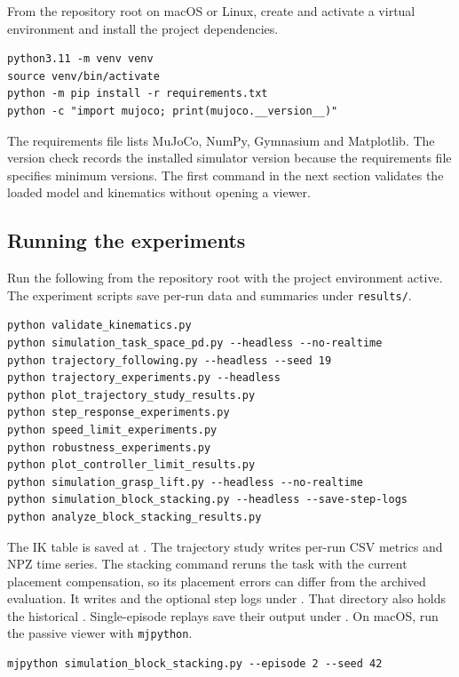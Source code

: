 \documentclass[12pt,a4paper]{article}
\begin{document}
From the repository root on macOS or Linux, create and activate a virtual environment and install the project dependencies.
\begin{samepage}
\begin{verbatim}
python3.11 -m venv venv
source venv/bin/activate
python -m pip install -r requirements.txt
python -c "import mujoco; print(mujoco.__version__)"
\end{verbatim}
\end{samepage}
The requirements file lists MuJoCo, NumPy, Gymnasium and Matplotlib. The version check records the installed simulator version because the requirements file specifies minimum versions. The first command in the next section validates the loaded model and kinematics without opening a viewer.

\subsection*{Running the experiments}
Run the following from the repository root with the project environment active. The experiment scripts save per-run data and summaries under \texttt{results/}.
\begin{verbatim}
python validate_kinematics.py
python simulation_task_space_pd.py --headless --no-realtime
python trajectory_following.py --headless --seed 19
python trajectory_experiments.py --headless
python plot_trajectory_study_results.py
python step_response_experiments.py
python speed_limit_experiments.py
python robustness_experiments.py
python plot_controller_limit_results.py
python simulation_grasp_lift.py --headless --no-realtime
python simulation_block_stacking.py --headless --save-step-logs
python analyze_block_stacking_results.py
\end{verbatim}
The IK table is saved at . The trajectory study writes per-run CSV metrics and NPZ time series. The stacking command reruns the task with the current placement compensation, so its placement errors can differ from the archived evaluation. It writes  and the optional step logs under . That directory also holds the historical . Single-episode replays save their output under . On macOS, run the passive viewer with \texttt{mjpython}.
\begin{verbatim}
mjpython simulation_block_stacking.py --episode 2 --seed 42
\end{verbatim}
\end{document}
